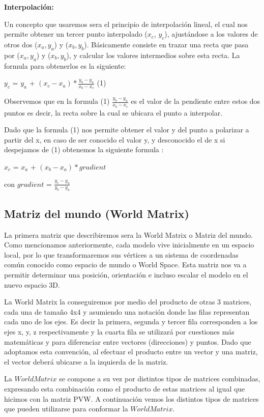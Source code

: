 \documentclass[a4paper]{article}
\begin{document}
\textbf{Interpolación:}


Un concepto que usaremos sera el principio de interpolación lineal,  el cual nos permite obtener un tercer punto interpolado ($x_c$, $y_c$),  ajustándose a los valores de otros dos ($x_a, y_a$) y ($x_b, y_b$). Básicamente consiste en trazar una recta que pasa por ($x_a,y_a$) y ($x_b,y_b$), y calcular los valores intermedios sobre esta recta. La formula para obtenerlos es la siguiente:

$y_c$ = $y_a$ + $(x_c - x_a)*\frac{y_b - y_a}{x_b - x_c}$  (1)

Observemos que en la formula (1) $\frac{y_b - y_a}{x_b - x_c}$ es el valor de la  pendiente entre estos dos puntos es decir, la recta sobre la cual se ubicara el punto a interpolar. 
\par Dado que la formula (1) nos permite obtener el valor y del punto a polarizar a partir del x, en caso de ser conocido el valor y, y desconocido el de x si despejamos de (1) obtenemos la siguiente formula :

$x_c$ = $x_a$ + $(x_b - x_a)*gradient$ 

con $gradient$  = $\frac{y_c - y_a}{y_b - y_a}$

 
\subsection{Matriz del mundo (World Matrix)}
La primera matriz que describiremos sera la  World Matrix o Matriz del mundo.
Como mencionamos anteriormente, cada modelo vive inicialmente en un espacio local,  por lo que transformaremos sus vértices a un sistema de coordenadas común conocido como espacio de mundo o World Space. Esta matriz nos va a permitir determinar una posición,  orientación e incluso escalar el modelo en el nuevo espacio 3D.
\par La World Matrix la conseguiremos por medio del producto de otras 3 matrices, cada una de tamaño 4x4 y asumiendo una notación donde las filas representan cada uno de los ejes. Es decir la primera, segunda y tercer fila corresponden a los ejes x, y, z respectivamente y la cuarta fila se utilizará por cuestiones más matemáticas y para diferenciar entre vectores (direcciones) y puntos. Dado que adoptamos esta convención, al efectuar el producto entre un vector y una matriz, el vector deberá ubicarse a la izquierda de la matriz.
\par La $World Matrix$ se compone a su vez por distintos tipos de matrices combinadas, expresando esta combinación como el producto de estas matrices al igual que hicimos con la matriz PVW. A continuación vemos los distintos tipos de matrices que pueden utilizarse para conformar la $World Matrix$.
\end{document}
